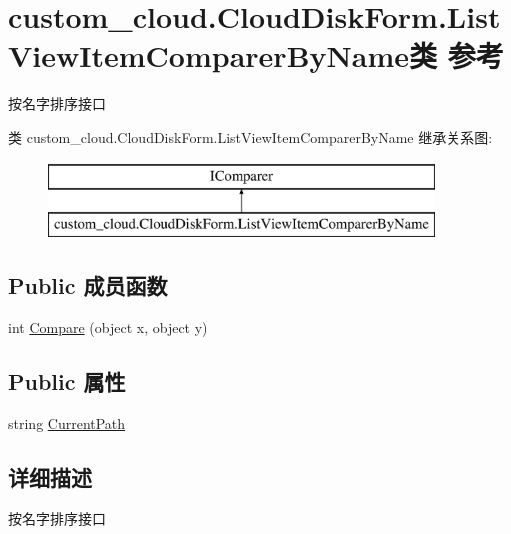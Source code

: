 \hypertarget{classcustom__cloud_1_1_cloud_disk_form_1_1_list_view_item_comparer_by_name}{}\section{custom\+\_\+cloud.\+Cloud\+Disk\+Form.\+List\+View\+Item\+Comparer\+By\+Name类 参考}
\label{classcustom__cloud_1_1_cloud_disk_form_1_1_list_view_item_comparer_by_name}


按名字排序接口  


类 custom\+\_\+cloud.\+Cloud\+Disk\+Form.\+List\+View\+Item\+Comparer\+By\+Name 继承关系图\+:\begin{figure}[H]
\begin{center}
\leavevmode
\includegraphics[height=2.000000cm]{classcustom__cloud_1_1_cloud_disk_form_1_1_list_view_item_comparer_by_name}
\end{center}
\end{figure}
\subsection*{Public 成员函数}
\begin{DoxyCompactItemize}
\item 
int \hyperlink{classcustom__cloud_1_1_cloud_disk_form_1_1_list_view_item_comparer_by_name_a964b0db057eb836f7791c6aa7da4874c}{Compare} (object x, object y)
\end{DoxyCompactItemize}
\subsection*{Public 属性}
\begin{DoxyCompactItemize}
\item 
string \hyperlink{classcustom__cloud_1_1_cloud_disk_form_1_1_list_view_item_comparer_by_name_ae81fd5aaf2b612bba0a7ccf3d28513e3}{Current\+Path}
\end{DoxyCompactItemize}


\subsection{详细描述}
按名字排序接口 



